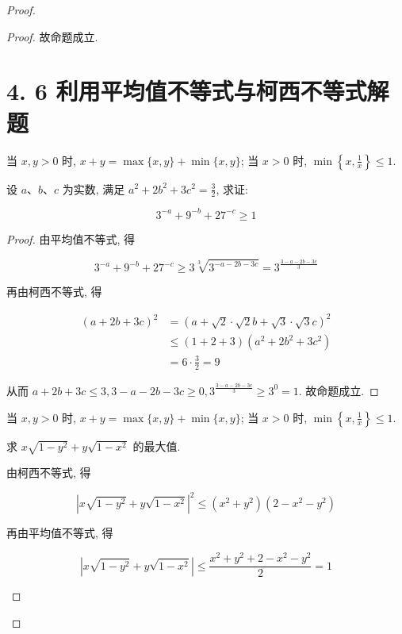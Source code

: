 \begin{proof}
\begin{example}
\begin{solution}
\begin{note}
\begin{solution}
\begin{proof}
	故命题成立.
	
	\section*{4. 6 利用平均值不等式与柯西不等式解题}
\begin{note}
	当 $x, y>0$ 时, $x+y=\max \{x, y\}+\min \{x, y\}$; 当 $x>0$ 时, $\min \left\{x, \frac{1}{x}\right\} \leqslant 1$.
\end{note}

\begin{example}
	设 $a 、 b 、 c$ 为实数, 满足 $a^{2}+2 b^{2}+3 c^{2}=\frac{3}{2}$, 求证:
	
	$$
	3^{-a}+9^{-b}+27^{-c} \geqslant 1
	$$
\end{example}
\begin{proof}
	由平均值不等式, 得
	
	$$
	3^{-a}+9^{-b}+27^{-c} \geqslant 3 \sqrt[3]{3^{-a-2 b-3 c}}=3^{\frac{3-a-2 b-3 c}{3}}
	$$
	
	再由柯西不等式, 得
	
	$$
	\begin{aligned}
	(a+2 b+3 c)^{2} & =(a+\sqrt{2} \cdot \sqrt{2} b+\sqrt{3} \cdot \sqrt{3} c)^{2} \\
	& \leqslant(1+2+3)\left(a^{2}+2 b^{2}+3 c^{2}\right) \\
	& =6 \cdot \frac{3}{2}=9
	\end{aligned}
	$$
	
	从而 $a+2 b+3 c \leqslant 3,3-a-2 b-3 c \geqslant 0,3^{\frac{3-a-2 b-3 c}{3}} \geqslant 3^{0}=1$. 故命题成立.
\end{proof}
\begin{note}
	当 $x, y>0$ 时, $x+y=\max \{x, y\}+\min \{x, y\}$; 当 $x>0$ 时, $\min \left\{x, \frac{1}{x}\right\} \leqslant 1$.
\end{note}

\begin{example}
	求 $x \sqrt{1-y^{2}}+y \sqrt{1-x^{2}}$ 的最大值.\\
\end{example}
\begin{solution}
	由柯西不等式, 得
	
	$$
	\left|x \sqrt{1-y^{2}}+y \sqrt{1-x^{2}}\right|^{2} \leqslant\left(x^{2}+y^{2}\right)\left(2-x^{2}-y^{2}\right)
	$$
	
	再由平均值不等式, 得
	
	$$
	\left|x \sqrt{1-y^{2}}+y \sqrt{1-x^{2}}\right| \leqslant \frac{x^{2}+y^{2}+2-x^{2}-y^{2}}{2}=1
	$$
	

\end{solution}
\end{proof}
\end{solution}
\end{note}
\end{solution}
\end{example}
\end{proof}
